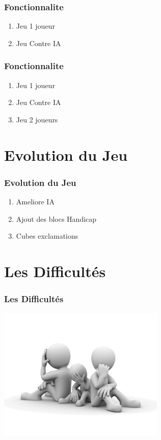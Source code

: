 \documentclass{beamer}
\begin{document}
\begin{darkframes}
 \begin{frame}
 	 \frametitle{Fonctionnalite}
 	   \begin{enumerate}
    \item Jeu 1 joueur 
    \item Jeu Contre IA
  \end{enumerate}
    \end{frame}
    
 \begin{frame}
 	 \frametitle{Fonctionnalite}
 	   \begin{enumerate}
    \item Jeu 1 joueur 
    \item Jeu Contre IA
    \item Jeu 2 joueurs 
  \end{enumerate}
    \end{frame}
    
     \section{Evolution du Jeu}
 \begin{frame}
  \frametitle{Evolution du Jeu}
 	   \begin{enumerate}
    \item Ameliore IA
    \item Ajout des blocs Handicap
    \item Cubes exclamations
  \end{enumerate}
    \end{frame}


     \section{Les Difficultés}
 \begin{frame}
  \frametitle{Les Difficultés}
   	 \begin{center}
  \includegraphics[scale=0.60]{./Image/difficulte.png}
  		\end{center}
    \end{frame}
    

\end{darkframes}
\end{document}
